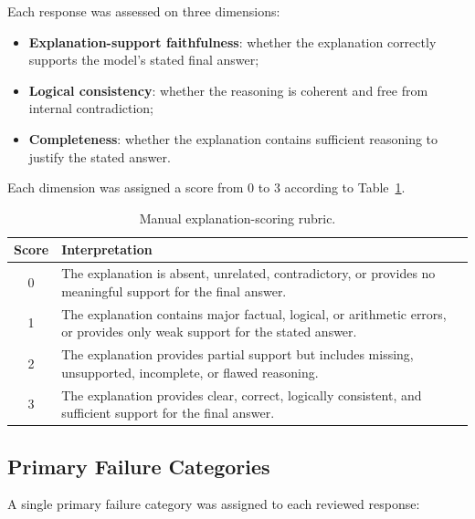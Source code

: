 \documentclass{article}
\begin{document}
Each response was assessed on three dimensions:

\begin{itemize}
    \item \textbf{Explanation-support faithfulness}: whether the explanation
    correctly supports the model's stated final answer;

    \item \textbf{Logical consistency}: whether the reasoning is coherent and
    free from internal contradiction;

    \item \textbf{Completeness}: whether the explanation contains sufficient
    reasoning to justify the stated answer.
\end{itemize}

Each dimension was assigned a score from 0 to 3 according to
Table~\ref{tab:appendix_rubric}.

\begin{table}[t]
\centering
\small
\caption{Manual explanation-scoring rubric.}
\label{tab:appendix_rubric}
\begin{tabular}{cp{8.8cm}}
\toprule
\textbf{Score} & \textbf{Interpretation} \\
\midrule
0 &
The explanation is absent, unrelated, contradictory, or provides no
meaningful support for the final answer. \\

1 &
The explanation contains major factual, logical, or arithmetic errors, or
provides only weak support for the stated answer. \\

2 &
The explanation provides partial support but includes missing, unsupported,
incomplete, or flawed reasoning. \\

3 &
The explanation provides clear, correct, logically consistent, and sufficient
support for the final answer. \\
\bottomrule
\end{tabular}
\end{table}

\subsection{Primary Failure Categories}

A single primary failure category was assigned to each reviewed response:
\end{document}

